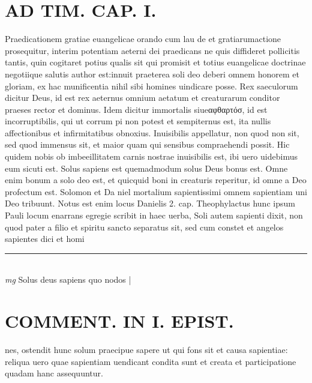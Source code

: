 \documentclass{article}
\begin{document}
\begin{pages}
\section*{AD TIM. CAP. I. }
\marginpar{[ p.106 ]}\pstart Praedicationem gratiae euangelicae orando cum lau de et gratiarumactione prosequitur, interim potentiam aeterni dei praedicans ne quis diffideret pollicitis tantis, quin cogitaret potius qualis sit qui promisit et totius euangelicae doctrinae negotiique salutis author est:innuit praeterea soli deo deberi omnem honorem et gloriam, ex hac munificentia nihil sibi homines uindicare posse. Rex saeculorum dicitur Deus, id est rex aeternus omnium aetatum et creaturarum conditor praeses rector et dominus. Idem dicitur immortalis siueαφθαρτόσ, id est incorruptibilis, qui ut corrum pi non potest et sempiternus est, ita nullis affectionibus et infirmitatibus obnoxius. Inuisibilis appellatur, non quod non sit, sed quod immensus sit, et maior quam qui sensibus compraehendi possit. Hic quidem nobis ob imbeeillitatem carnis nostrae inuisibilis est, ibi uero uidebimus eum sicuti est. Solus sapiens est quemadmodum solus Deus bonus est. Omne enim bonum a solo deo est, et quicquid boni in creaturis reperitur, id omne a Deo profectum est. Solomon et Da niel mortalium sapientissimi omnem sapientiam uni Deo tribuunt. Notus est enim locus Danielis 2. cap. Theophylactus hunc ipsum Pauli locum enarrans egregie scribit in haec uerba, Soli autem sapienti dixit, non quod pater a filio et spiritu sancto separatus sit, sed cum constet et angelos sapientes dici et homi\pend
\vspace{0.5cm}\noindent
\vspace{0.2cm}\rule{1cm}{0.2pt}\\ 
\hspace{0.2cm}\textit{mg}
\footnotesize Solus deus sapiens quo nodos 
\normalsize| 
\section*{COMMENT. IN I. EPIST. }\pstart nes, ostendit hunc solum praecipue sapere ut qui fons sit et causa sapientiae: reliqua uero quae sapientiam uendicant condita sunt et creata et participatione quadam hanc assequuntur.  \pend
{}
{}

\end{pages}
\end{document}

